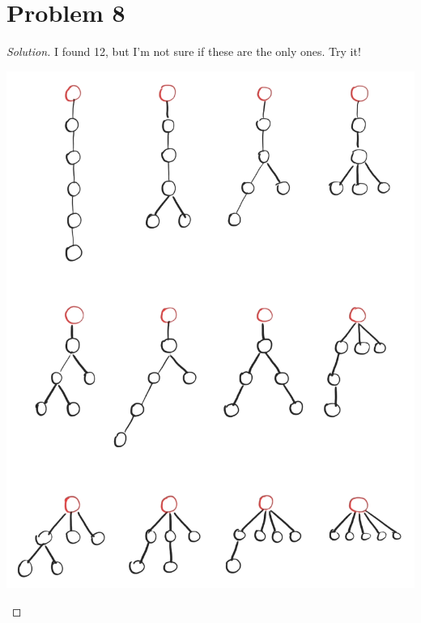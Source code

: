 \section*{Problem 8}
	\begin{proof} [Solution]
		I found 12, but I'm not sure if these are the only ones. Try it!
		\begin{center}
			\includegraphics[height=0.85\textheight]{iso6.png}
		\end{center}
	\end{proof}